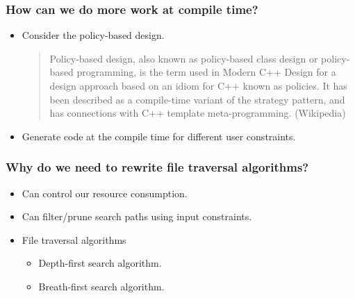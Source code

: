 \documentclass[bigger]{beamer}
\begin{document}
\begin{frame}
    \frametitle{How can we do more work at compile time?}
    \pause
    \begin{itemize}
    \item Consider the policy-based design.
        \pause
        \begin{quote}
            Policy-based design, also known as policy-based class design or
            policy-based programming, is the term used in Modern C++ Design for a
            design approach based on an idiom for C++ known as policies. It has
            been described as a compile-time variant of the strategy pattern, and
            has connections with C++ template meta-programming. (Wikipedia)
        \end{quote}
    \item Generate code at the compile time for different user constraints.
    \end{itemize}
\end{frame}

\begin{frame}
    \frametitle{Why do we need to rewrite file traversal algorithms?}
    \begin{itemize}
    \item Can control our resource consumption.
        \pause
    \item Can filter/prune search paths using input constraints.
        \pause
    \item File traversal algorithms
        \begin{itemize}
            \pause
        \item Depth-first search algorithm.
            \pause
        \item Breath-first search algorithm.
        \end{itemize}
    \end{itemize}
\end{frame}
\end{document}
